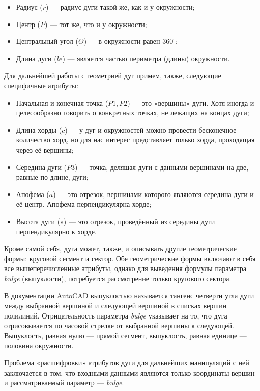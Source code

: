 \begin{itemize}
	\item Радиус ($r$) --- радиус дуги такой же, как и у окружности;
	\item Центр ($P$) --- тот же, что и у окружности;
	\item Центральный угол ($\Theta$) --- в окружности равен $360^{\circ}$;
	\item Длина дуги ($le$) --- является частью периметра (длины) окружности.
\end{itemize}

Для дальнейшей работы с геометрией дуг примем, также, следующие специфичные атрибуты:

\begin{itemize}
	\item Начальная и конечная точка ($P1, P2$) --- это «вершины» дуги. Хотя иногда и целесообразно говорить о конкретных точках, не лежащих на концах дуги;
	\item Длина хорды ($c$) --- у дуг и окружностей можно провести бесконечное количество хорд, но для нас интерес представляет только хорда, проходящая через её вершины;
	\item Середина дуги ($P3$) --- точка, делящая дуги с данными вершинами на две, равные по длине, дуги;
	\item Апофема ($a$) --- это отрезок, вершинами которого являются середина дуги и её центр. Апофема перпендикулярна хорде;
	\item Высота дуги ($s$) --- это отрезок, проведённый из середины дуги перпендикулярно к хорде.
\end{itemize}

Кроме самой себя, дуга может, также, и описывать другие геометрические формы: круговой сегмент и сектор. Обе геометрические формы включают в себя все вышеперечисленные атрибуты, однако для выведения формулы параметра \textit{bulge} (выпуклости), потребуется рассмотрение только кругового сектора.

В документации AutoCAD \cite{Autodesk} выпуклостью называется тангенс четверти угла дуги между выбранной вершиной и следующей вершиной в списках вершин полилиний. Отрицательность параметра \textit{bulge} указывает на то, что дуга отрисовывается по часовой стрелке от выбранной вершины к следующей. Выпуклость, равная нулю --- прямой сегмент, выпуклость, равная единице --- половина окружности.

Проблема «расшифровки» атрибутов дуги для дальнейших манипуляций с ней заключается в том, что входными данными являются только координаты вершин и рассматриваемый параметр --- \textit{bulge}.

